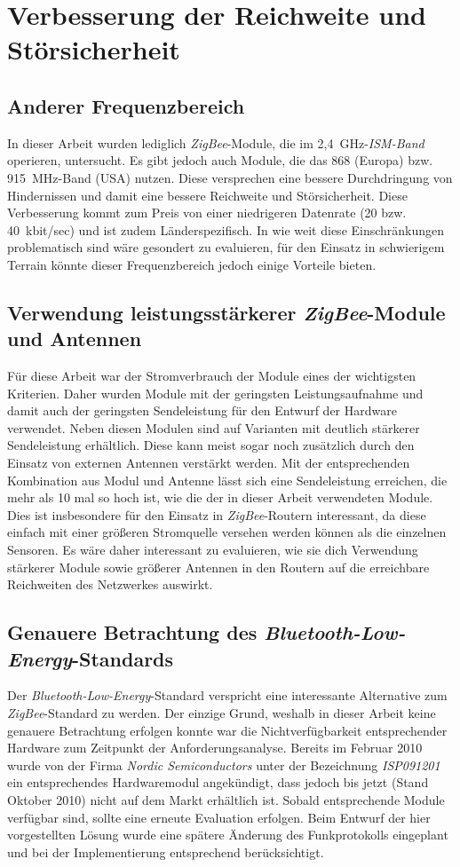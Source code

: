 \section{Verbesserung der Reichweite und Störsicherheit}
\subsection{Anderer Frequenzbereich}
In dieser Arbeit wurden lediglich \emph{ZigBee}-Module, die im 2,4~GHz-\emph{ISM-Band} operieren, untersucht. Es gibt
jedoch auch Module, die das 868 (Europa) bzw. 915~MHz-Band (USA) nutzen. Diese versprechen eine bessere Durchdringung
von Hindernissen und damit eine bessere Reichweite und Störsicherheit. Diese Verbesserung kommt zum Preis von einer
niedrigeren Datenrate (20 bzw. 40~kbit/sec) und ist zudem Länderspezifisch. In wie weit diese Einschränkungen problematisch
sind wäre gesondert zu evaluieren, für den Einsatz in schwierigem Terrain könnte dieser Frequenzbereich jedoch einige
Vorteile bieten.

\subsection{Verwendung leistungsstärkerer \emph{ZigBee}-Module und Antennen}
Für diese Arbeit war der Stromverbrauch der Module eines der wichtigsten Kriterien. Daher wurden Module mit der geringsten
Leistungsaufnahme und damit auch der geringsten Sendeleistung für den Entwurf der Hardware verwendet. Neben diesen
Modulen sind auf Varianten mit deutlich stärkerer Sendeleistung erhältlich. Diese kann meist sogar noch zusätzlich durch
den Einsatz von externen Antennen verstärkt werden. Mit der entsprechenden Kombination aus Modul und Antenne lässt sich eine
Sendeleistung erreichen, die mehr als 10 mal so hoch ist, wie die der in dieser Arbeit verwendeten Module. Dies ist 
insbesondere für den Einsatz in \emph{ZigBee}-Routern interessant, da diese einfach mit einer größeren Stromquelle versehen
werden können als die einzelnen Sensoren. Es wäre daher interessant zu evaluieren, wie sie dich Verwendung stärkerer Module
sowie größerer Antennen in den Routern auf die erreichbare Reichweiten des Netzwerkes auswirkt.

\subsection{Genauere Betrachtung des \emph{Bluetooth-Low-Energy}-Standards}
Der \emph{Bluetooth-Low-Energy}-Standard verspricht eine interessante Alternative zum \emph{ZigBee}-Standard zu werden.
Der einzige Grund, weshalb in dieser Arbeit keine genauere Betrachtung erfolgen konnte war die Nichtverfügbarkeit
entsprechender Hardware zum Zeitpunkt der Anforderungsanalyse. Bereits im Februar 2010 wurde von der Firma 
\emph{Nordic Semiconductors} unter der Bezeichnung \emph{ISP091201} ein entsprechendes Hardwaremodul angekündigt,
dass jedoch bis jetzt (Stand Oktober 2010) nicht auf dem Markt erhältlich ist. Sobald entsprechende Module verfügbar
sind, sollte eine erneute Evaluation erfolgen. Beim Entwurf der hier vorgestellten Lösung wurde eine spätere Änderung
des Funkprotokolls eingeplant und bei der Implementierung entsprechend berücksichtigt.

